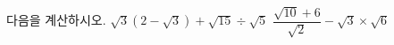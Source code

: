 다음을 계산하시오.
 $\sqrt{3}(2-\sqrt{3})+\sqrt{15}\div\sqrt{5}$
 $\dfrac{\sqrt{10}+6}{\sqrt{2}}-\sqrt{3}\times\sqrt{6}$
